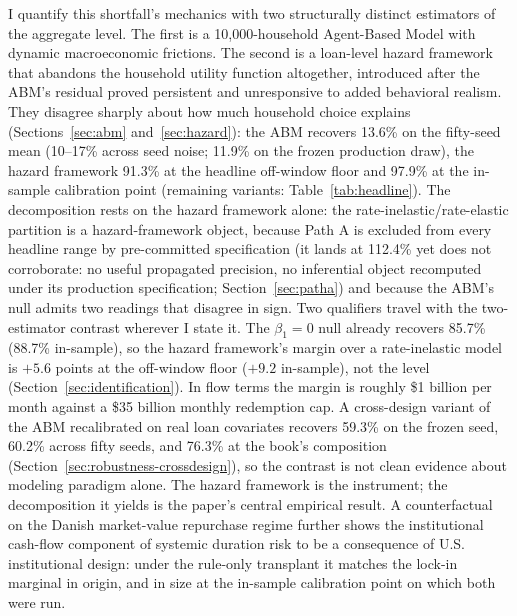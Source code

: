 \documentclass[12pt]{article}
\begin{document}
I quantify this shortfall's mechanics with two structurally distinct estimators of the aggregate level. The first is a 10,000-household Agent-Based Model with dynamic macroeconomic frictions. The second is a loan-level hazard framework that abandons the household utility function altogether, introduced after the ABM's residual proved persistent and unresponsive to added behavioral realism. They disagree sharply about how much household choice explains (Sections~\ref{sec:abm} and~\ref{sec:hazard}): the ABM recovers 13.6\% on the fifty-seed mean (10--17\% across seed noise; 11.9\% on the frozen production draw), the hazard framework 91.3\% at the headline off-window floor and 97.9\% at the in-sample calibration point (remaining variants: Table~\ref{tab:headline}). The decomposition rests on the hazard framework alone: the rate-inelastic/rate-elastic partition is a hazard-framework object, because Path A is excluded from every headline range by pre-committed specification (it lands at 112.4\% yet does not corroborate: no useful propagated precision, no inferential object recomputed under its production specification; Section~\ref{sec:patha}) and because the ABM's null admits two readings that disagree in sign. Two qualifiers travel with the two-estimator contrast wherever I state it. The $\beta_1 = 0$ null already recovers 85.7\% (88.7\% in-sample), so the hazard framework's margin over a rate-inelastic model is $+5.6$ points at the off-window floor ($+9.2$ in-sample), not the level (Section~\ref{sec:identification}). In flow terms the margin is roughly \$1 billion per month against a \$35 billion monthly redemption cap. A cross-design variant of the ABM recalibrated on real loan covariates recovers 59.3\% on the frozen seed, 60.2\% across fifty seeds, and 76.3\% at the book's composition (Section~\ref{sec:robustness-crossdesign}), so the contrast is not clean evidence about modeling paradigm alone. The hazard framework is the instrument; the decomposition it yields is the paper's central empirical result. A counterfactual on the Danish market-value repurchase regime further shows the institutional cash-flow component of systemic duration risk to be a consequence of U.S. institutional design: under the rule-only transplant it matches the lock-in marginal in origin, and in size at the in-sample calibration point on which both were run.
\end{document}
